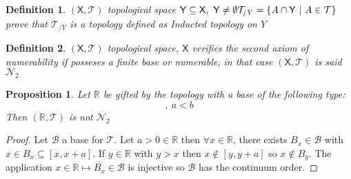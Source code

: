 \documentclass{article}
\newtheorem{proposition}{Proposition}
\newtheorem{definition}{Definition}
\begin{document}
    \begin{definition}
        $(\mathsf{X}, \mathcal{T})$ topological space $\mathsf{Y} \subseteq \mathsf{X}, \ \mathsf{Y} \neq \emptyset \\ \mathcal{T}_{/Y} = \{ A\cap \mathsf{Y} \ | \ A \in \mathcal{T} \}$ prove that $\mathcal{T}_{/Y}$ is a topology defined as Inducted topology on $Y$
    \end{definition}
    \begin{definition}
        $(\mathsf{X}, \mathcal{T})$ topological space, $\mathsf{X}$ verifies the second axiom of numerability if posseses a finite base or numerable, in that case $(\mathsf{X}, \mathcal{T})$ is said $\mathcal{N}_2$
    \end{definition}
    \begin{proposition}
        Let $\mathbb{R}$ be gifted by the topology with a base of the following type: 
        \begin{equation*}
            [a,b], \ a < b    
        \end{equation*}
        Then $(\mathbb{R}, \mathcal{T})$ is not $\mathcal{N}_2$
    \end{proposition}
    \begin{proof}
        Let $\mathcal{B}$ a base for $\mathcal{T}$. Let $a > 0 \in \mathbb{R}$ then $\forall x  \in \mathbb{R}$, there exists $B_x \in \mathcal{B}$ with $x \in B_x \subseteq [x, x + a]$.
        If $y \in \mathbb{R}$ with $y > x$ then $x \notin [y, y + a]$ so $x \notin B_y$.
        The application $x\in \mathbb{R} \longmapsto B_x \in \mathcal{B}$  is injective so $ \mathcal{B}$ has the continuum order.    
    \end{proof}
\end{document}
